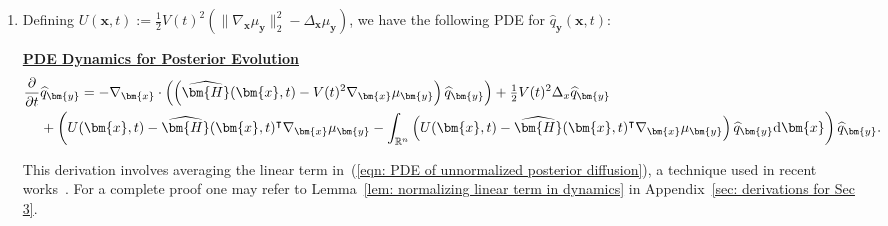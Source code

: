 \documentclass{article}
\makeatletter
\numberwithin{equation}{section}
\newtheorem{remark}[theorem]{Remark}
\def\eqref#1{(\ref{#1})}
\newcommand{\dif}{{\mathrm{d}}}
\def\vx{{\bm{x}}}
\def\vy{{\bm{y}}}
\def\vphi{{\bm{\phi}}}
\def\mH{{\bm{H}}}
\DeclareRobustCommand{\cev}[1]{%
  {\mathpalette\do@cev{#1}}%
}
\newcommand{\do@cev}[2]{%
  \vbox{\offinterlineskip
    \sbox\z@{$\m@th#1 x$}%
    \ialign{##\cr
      \hidewidth\reflectbox{$\m@th#1\vec{}\mkern4mu$}\hidewidth\cr
      \noalign{\kern-\ht\z@}
      $\m@th#1#2$\cr
    }%
  }%
}
\makeatother
\begin{document}
\begin{enumerate}[leftmargin=*, topsep=0pt, itemsep=2pt, wide]
    \item Defining $U(\vx, t) := \frac{1}{2}V(t)^2\left(\|\nabla_{\vx}\mu_{\vy}\|_2^2-\Delta_{\vx}\mu_{\vy}\right)$, we have the following PDE for $\widehat{q}_{\vy}(\vx,t)$:
    \begin{tcolorbox}[colback=lightgray,boxrule=0pt,sharp corners]
        \underline{\bfseries PDE Dynamics for Posterior Evolution}
        \begin{equation}
            \setlength{\abovedisplayskip}{3pt}
            \setlength{\belowdisplayskip}{3pt}
            \label{eqn: PDE of posterior diffusion}
            \begin{aligned}
            \frac{\partial}{\partial t}&\widehat{q}_{\vy} = -\nabla_{\vx} \cdot \left(\left(\widehat{\mH}(\vx,t)-V(t)^2\nabla_{\vx}\mu_{\vy}\right)\widehat{q}_{\vy}\right)
            +\tfrac{1}{2}V(t)^2\Delta_{x}\widehat{q}_{\vy}\\
            &+\left(U(\vx,t) - \widehat{\mH}(\vx,t)^\intercal\nabla_{\vx}\mu_{\vy} - \int_{\mathbb{R}^n}\left(U(\vx,t) - \widehat{\mH}(\vx,t)^\intercal\nabla_{\vx}\mu_{\vy}\right)\widehat{q}_{\vy}\dif \vx\right)\widehat{q}_{\vy}.
            \end{aligned}
        \end{equation}
    \end{tcolorbox}
    This derivation involves averaging the linear term in~\eqref{eqn: PDE of unnormalized posterior diffusion}, a technique used in recent works~\cite{skreta2025feynman,lee2025debiasing,holderrieth2025leaps}. For a complete proof one may refer to Lemma~\ref{lem: normalizing linear term in dynamics} in Appendix~\ref{sec: derivations for Sec 3}.
\end{enumerate}

\end{document}
